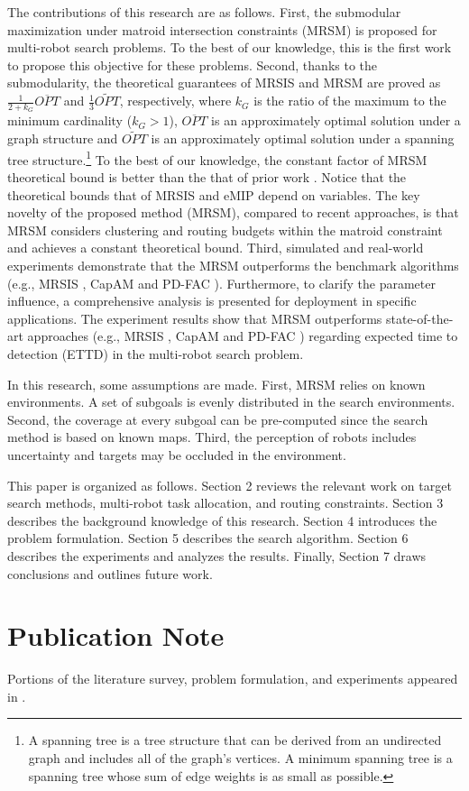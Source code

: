 The contributions of this research are as follows.
First,  the submodular maximization under matroid intersection constraints (MRSM) is proposed for multi-robot search problems.
To the best of our knowledge, this is the first work to propose this objective for these problems.
Second, thanks to the submodularity,
the theoretical guarantees of MRSIS \cite{li2024mrsis} and MRSM are proved as $\frac{1}{2+k_G} \overline{OPT}$ and $\frac{1}{3}\widetilde{OPT}$, respectively, where $k_G$ is the ratio of the maximum to the minimum cardinality ($k_G > 1$), $\overline{OPT}$ is an approximately optimal solution under a graph structure and $\widetilde{OPT}$ is an approximately optimal solution under a spanning tree structure.\footnote{A spanning tree is a tree structure that can be derived from an undirected graph and includes all of the graph's vertices. A minimum spanning tree is a spanning tree whose sum of edge weights is as small as possible.}
To the best of our knowledge, the constant factor of MRSM theoretical bound is better than the that of prior work \cite{li2024mrsis}.
Notice that the theoretical bounds that of MRSIS \cite{li2024mrsis} and eMIP \cite{singh2007efficient} depend on variables.
The key novelty of the proposed method (MRSM), compared to recent approaches, is that MRSM considers clustering and routing budgets within the matroid constraint and achieves a constant theoretical bound.
Third, simulated and real-world experiments demonstrate that the MRSM outperforms the benchmark algorithms (e.g., MRSIS \cite{li2024mrsis}, CapAM \cite{paull2022learning} and PD-FAC \cite{sheng2022pd}). Furthermore, to clarify the parameter influence, a comprehensive analysis is presented for deployment in specific applications.
The experiment results show that MRSM outperforms state-of-the-art approaches (e.g., MRSIS \cite{li2024mrsis}, CapAM \cite{paull2022learning} and PD-FAC \cite{sheng2022pd}) regarding expected time to detection (ETTD) in the multi-robot search problem.

In this research, some assumptions are made. First, MRSM relies on known environments. A set of subgoals is evenly distributed in the search environments.
Second, the coverage at every subgoal can be pre-computed since the search method is based on known maps.
Third, the perception of robots includes uncertainty and targets may be occluded in the environment.

This paper is organized as follows. Section 2 reviews the relevant work on target search methods, multi-robot task allocation, and routing constraints. Section 3 describes the background knowledge of this research. Section 4 introduces the problem formulation. Section 5 describes the search algorithm. Section 6 describes the experiments and analyzes the results. Finally, Section 7 draws conclusions and outlines future work.

\section{Publication Note}
Portions of the literature survey, problem formulation, and experiments appeared in \cite{li2024mrsis} \cite{li2024casmo}.

